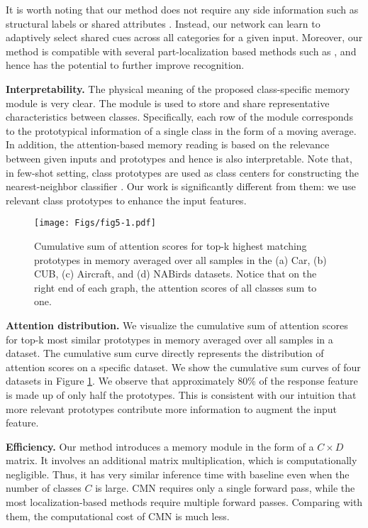 \documentclass[journal]{IEEEtran}
\begin{document}
It is worth noting that our method does not require any side information such as structural labels \cite{xie2015hyper,wang2015multiple} or shared attributes \cite{zhou2016fine}.
Instead, our network can learn to adaptively select shared cues across all categories for a given input. Moreover, our method is compatible with several part-localization based methods such as  \cite{zheng2019looking,recasens2018learning}, and hence has the potential to further improve recognition. 

\textbf{Interpretability.} The physical meaning of the proposed class-specific memory module is very clear. The module is used to store and share representative characteristics between classes. Specifically, each row of the module corresponds to the prototypical information of a single class in the form of a moving average.
In addition, the attention-based memory reading is based on the relevance between given inputs and prototypes and hence is also interpretable. 
Note that, in few-shot setting, class prototypes are used as class centers for constructing the nearest-neighbor classifier \cite{hsu2018unsupervised,snell2017prototypical,wertheimer2019few}. Our work is significantly different from them: we use relevant class prototypes to enhance the input features.

\begin{figure}[t]
\begin{center}
\texttt{[image: Figs/fig5-1.pdf]}
\end{center}
\caption{Cumulative sum of attention scores for top-k highest matching prototypes in memory averaged over all samples in the (a) Car, (b) CUB, (c) Aircraft, and (d) NABirds datasets. Notice that on the right end of each graph, the attention scores of all classes sum to one.}
\label{fig7}
\end{figure}


\textbf{Attention distribution.} We visualize the cumulative sum of attention scores for top-k most similar prototypes in memory averaged over all samples in a dataset. The cumulative sum curve directly represents the distribution of attention scores on a specific dataset. We show the cumulative sum curves of four datasets in Figure \ref{fig7}.
We observe that approximately 80\% of the response feature is made up of only half the prototypes. This is consistent with our intuition that more relevant prototypes contribute more information to augment the input feature. 

\textbf{Efficiency.} Our method introduces a memory module in the form of a $C \times D$ matrix. It involves an additional matrix multiplication, which is computationally negligible. Thus, it has very similar inference time with baseline even when the number of classes $C$ is large.
CMN requires only a single forward pass, while the most localization-based methods \cite{yang2018learning,zheng2019looking} require multiple forward passes. Comparing with them, the computational cost of CMN is much less.
\end{document}
